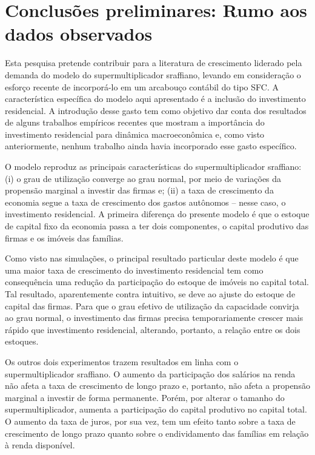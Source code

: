 \section{Conclusões preliminares: Rumo aos dados observados}\label{Conclusao_Modelo}

Esta pesquisa pretende contribuir para a literatura de crescimento liderado pela demanda do modelo do supermultiplicador sraffiano, levando em consideração o esforço recente de incorporá-lo em um arcabouço contábil do tipo SFC.  A característica específica do modelo aqui apresentado é a inclusão do investimento residencial. A introdução desse gasto tem como objetivo dar conta dos resultados de alguns trabalhos empíricos recentes que mostram a importância do investimento residencial para dinâmica macroeconômica e, como visto anteriormente, nenhum trabalho ainda havia incorporado esse gasto específico. 

O modelo reproduz as principais características do supermultiplicador sraffiano: (i) o grau de utilização converge ao grau normal, por meio de variações da propensão marginal a investir das firmas e; (ii) a taxa de crescimento da economia segue a taxa de crescimento dos gastos autônomos – nesse caso, o investimento residencial. A primeira diferença do  presente modelo é que o estoque de capital fixo da economia passa a ter dois componentes, o capital produtivo das firmas e os imóveis das famílias. 

Como visto nas simulações, o principal resultado particular deste modelo é que uma maior taxa de crescimento do investimento residencial tem como consequência uma redução da participação do estoque de imóveis no capital total. Tal resultado, aparentemente contra intuitivo, se deve ao ajuste do estoque de capital das firmas. Para que o grau efetivo de utilização da capacidade convirja ao grau normal, o investimento das firmas precisa temporariamente crescer mais rápido que investimento residencial, alterando, portanto, a relação entre os dois estoques. 

Os outros dois experimentos trazem resultados em linha com o supermultiplicador sraffiano. O aumento da participação dos salários na renda não afeta a taxa de crescimento de longo prazo e, portanto, não afeta a propensão marginal a investir de forma permanente. Porém, por alterar o tamanho do supermultiplicador, aumenta a participação do capital produtivo no capital total. O aumento da taxa de juros, por sua vez, tem um efeito tanto sobre a taxa de crescimento de longo prazo quanto sobre o endividamento das famílias em relação à renda disponível. 


